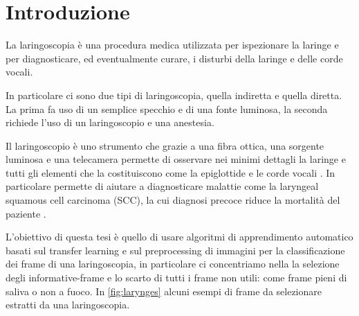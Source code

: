 \chapter{Introduzione}\label{introduzione}

La laringoscopia è una procedura medica utilizzata per ispezionare la laringe e per diagnosticare, ed eventualmente curare, i disturbi della laringe e delle corde vocali.

In particolare ci sono due tipi di laringoscopia, quella indiretta e quella diretta. La prima fa uso di un semplice specchio e di una fonte luminosa, la seconda richiede l'uso di un laringoscopio e una anestesia.

Il laringoscopio è uno strumento che grazie a una fibra ottica, una sorgente luminosa e una telecamera permette di osservare nei minimi dettagli la laringe e tutti gli elementi che la costituiscono come la epiglottide e le corde vocali \cite{giorgio_cenni_2008}. In particolare permette di aiutare a diagnosticare malattie come la laryngeal squamous cell carcinoma (SCC), la cui diagnosi precoce riduce la mortalità del paziente \cite{moccia_larynge}.

L'obiettivo di questa tesi è quello di usare algoritmi di apprendimento automatico basati sul transfer learning e sul  preprocessing di immagini  per la classificazione dei frame di una laringoscopia, in particolare ci concentriamo nella la selezione degli informative-frame e lo scarto di tutti i frame non utili: come frame pieni di saliva o non a fuoco. In \cref{fig:larynges} alcuni esempi di frame da selezionare estratti da una laringoscopia.

